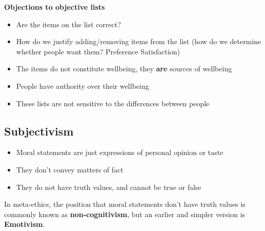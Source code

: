 \documentclass{article}
\begin{document}
        \bigbreak \textbf{Objections to objective lists}
        \begin{itemize}
            \item Are the items on the list correct?
            \item How do we justify adding/removing items from the list (how do we determine whether people want them? Preference Satisfaction)
            \item The items do not constitute wellbeing, they \textbf{are} sources of wellbeing
            \item People have authority over their wellbeing
            \item These lists are not sensitive to the differences between people
        \end{itemize}{}
    
    \subsection{Subjectivism}
    \begin{itemize}
        \item Moral statements are just expressions of personal opinion or taste
        \item They don't convey matters of fact
        \item They do not have truth values, and cannot be true or false
    \end{itemize}{}
    In meta-ethics, the position that moral statements don't have truth values is commonly known as \textbf{non-cognitivism}, but an earlier and simpler version is \textbf{Emotivism}.
\end{document}

